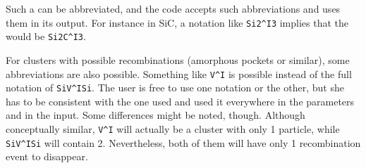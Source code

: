 Such a  can be abbreviated, and the code accepts such abbreviations and uses them in its output. For instance in SiC, a notation like \verb+Si2^I3+ implies that the  would be \verb+Si2C^I3+.

For clusters with possible {\idx recombinations} (amorphous pockets or similar), some abbreviations are also possible. Something like \verb+V^I+ is possible instead of the full notation of \verb+SiV^ISi+. The user is free to use one notation or the other, but she has to be consistent with the one used and used it everywhere in the parameters and in the input. Some differences might be noted, though. Although conceptually similar, \verb+V^I+ will actually be a cluster with only 1 particle, while \verb+SiV^ISi+ will contain 2. Nevertheless, both of them will have only 1 recombination event to disappear.
